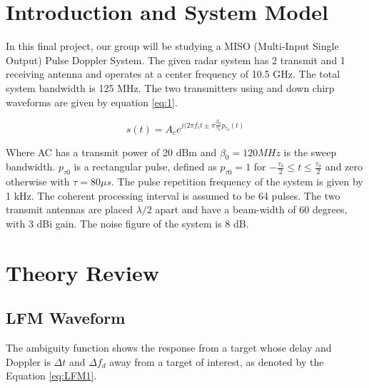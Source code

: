 \documentclass{article}
\title{\myAssignmentName}
\author{Matt Gambill \\ \href{mailto:gambill.46@osu.edu}{\textcolor{blue}{\underline{gambill.46@osu.edu}}} \and  Enzo Ocampo\\  \href{mailto:ocampo.29@osu.edu}{\textcolor{blue}{\underline{ocampo.29@osu.edu}}}}
\date{April 23, 2020}
\begin{document}
\begin{titlingpage}
\maketitle
\end{titlingpage}
\tableofcontents

\listoffigures

\listoftables
\newpage

\renewcommand{\theequation}{\thesubsection.\arabic{equation}}

\section{Introduction and System Model}
In this final project, our group will be studying a MISO (Multi-Input Single Output) Pulse Doppler System. The given radar system has 2 transmit and 1 receiving antenna and operates at a center frequency of 10.5 GHz. The total system bandwidth is 125 MHz. The two transmitters using and down chirp waveforms are given by equation \ref{eq:1}.

\begin{equation}
    s(t) = A_c e^{j(2\pi f_c t \pm \pi \frac{\beta_0}{\tau_0} p_{\tau_0}(t)}
    \label{eq:1}
\end{equation}

Where AC has a transmit power of 20 dBm and $\beta_{0} = 120 MHz$ is the sweep bandwidth. $p_{\tau0}$ is a rectangular pulse, deﬁned as $p_{\tau0} = 1$ for $-\frac{\tau_{0}}{2} \leq t \leq \frac{\tau_{0}}{2}$ and zero otherwise with  $\tau = 80 \mu s$. The pulse repetition frequency of the system is given by 1 kHz. The coherent processing interval is assumed to be 64 pulses. The two transmit antennas are placed $\lambda/2$ apart and have a beam-width of 60 degrees, with 3 dBi gain. The noise ﬁgure of the system is 8 dB.

\section{Theory Review}
\subsection{LFM Waveform}
The ambiguity function shows the response from a target whose delay and Doppler is $\Delta t$ and $ \Delta f_d$  away from a target of interest, as denoted by the Equation \ref{eq:LFM1}.
\end{document}
